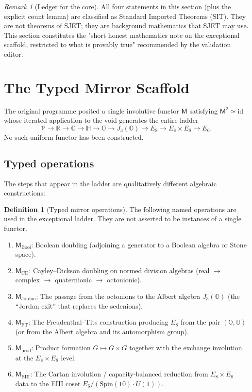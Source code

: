 \documentclass[11pt]{article}
\theoremstyle{plain}
\theoremstyle{definition}
\newtheorem{definition}[theorem]{Definition}
\theoremstyle{remark}
\newtheorem{remark}[theorem]{Remark}
\numberwithin{equation}{section}
\newcommand{\R}{\mathbb{R}}
\newcommand{\C}{\mathbb{C}}
\newcommand{\Quat}{\mathbb{H}}
\newcommand{\Oct}{\mathbb{O}}
\newcommand{\Spin}{\mathrm{Spin}}
\newcommand{\Void}{\mathcal{V}}
\newcommand{\Mirror}{\mathsf{M}}
\begin{document}
\begin{remark}[Ledger for the core]
All four statements in this section (plus the explicit count lemma) are classified as Standard Imported Theorems (SIT). They are not theorems of SJET; they are background mathematics that SJET may use. This section constitutes the "short honest mathematics note on the exceptional scaffold, restricted to what is provably true" recommended by the validation editor.
\end{remark}

\section{The Typed Mirror Scaffold}
\label{sec:typed-mirror}

The original programme posited a single involutive functor $\Mirror$ satisfying $\Mirror^2\simeq\mathrm{id}$ whose iterated application to the void generates the entire ladder
\[
\Void\to\R\to\C\to\Quat\to\Oct\to J_3(\Oct)\to E_8\to E_8\times E_8\to E_6.
\]
No such uniform functor has been constructed.

\subsection{Typed operations}

The steps that appear in the ladder are qualitatively different algebraic constructions:

\begin{definition}[Typed mirror operations]\label{def:typed-mirror}
The following named operations are used in the exceptional ladder. They are not asserted to be instances of a single functor.
\begin{enumerate}[label=\textbf{M\arabic*.}]
\item $\Mirror_{\mathrm{Bool}}$: Boolean doubling (adjoining a generator to a Boolean algebra or Stone space).
\item $\Mirror_{\mathrm{CD}}$: Cayley--Dickson doubling on normed division algebras (real $\to$ complex $\to$ quaternionic $\to$ octonionic).
\item $\Mirror_{\mathrm{Jordan}}$: The passage from the octonions to the Albert algebra $J_3(\Oct)$ (the ``Jordan exit'' that replaces the sedenions).
\item $\Mirror_{\mathrm{FT}}$: The Freudenthal--Tits construction producing $E_8$ from the pair $(\Oct,\Oct)$ (or from the Albert algebra and its automorphism group).
\item $\Mirror_{\mathrm{prod}}$: Product formation $G\mapsto G\times G$ together with the exchange involution at the $E_8\times E_8$ level.
\item $\Mirror_{\mathrm{EIII}}$: The Cartan involution / capacity-balanced reduction from $E_8\times E_8$ data to the EIII coset $E_6/(\Spin(10)\cdot U(1))$.
\end{enumerate}
\end{definition}
\end{document}
